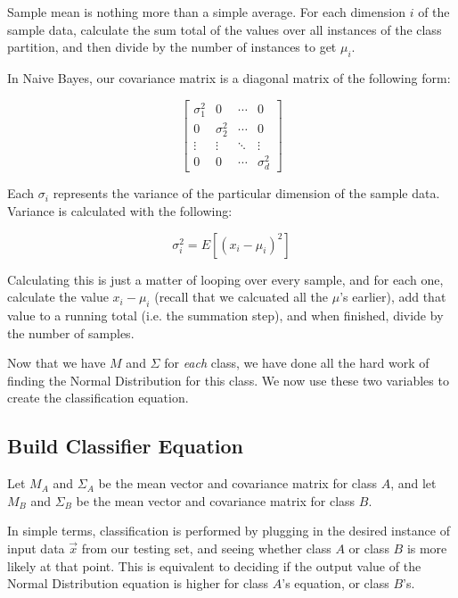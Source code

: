 \documentclass{article}
\begin{document}
Sample mean is nothing more than a simple average.  For each dimension
$i$ of the sample data, calculate the sum total of the values over all
instances of the class partition, and then divide by the number of
instances to get $\mu_i$.

In Naive Bayes, our covariance matrix is a diagonal matrix of the
following form:

\begin{displaymath}
\begin{bmatrix} \sigma^2_1 & 0 & \cdots & 0 \\
				 0 & \sigma^2_2 & \cdots & 0 \\
				 \vdots & \vdots & \ddots & \vdots \\
				 0 & 0 & \cdots & \sigma^2_d
\end{bmatrix}
\end{displaymath}

Each $\sigma_i$ represents the variance of the particular dimension of
the sample data.  Variance is calculated with the following:

\begin{displaymath}
 \sigma^2_i = E [{(x_i - \mu_i)}^2]
\end{displaymath}

Calculating this is just a matter of looping over every sample, and
for each one, calculate the value $x_i - \mu_i$ (recall that we
calcuated all the $\mu$'s earlier), add that value to a running total
(i.e. the summation step), and when finished, divide by the number of
samples.

Now that we have $M$ and $\Sigma$ for \emph{each} class, we have done
all the hard work of finding the Normal Distribution for this class.
We now use these two variables to create the classification equation.

\subsection{Build Classifier Equation}

Let $M_A$ and $\Sigma_A$ be the mean vector and covariance matrix for
class $A$, and let $M_B$ and $\Sigma_B$ be the mean vector and
covariance matrix for class $B$.

In simple terms, classification is performed by plugging in the
desired instance of input data $\vec{x}$ from our testing set, and
seeing whether class $A$ or class $B$ is more likely at that
point. This is equivalent to deciding if the output value of the
Normal Distribution equation is higher for class $A$'s equation, or
class $B$'s.
\end{document}
